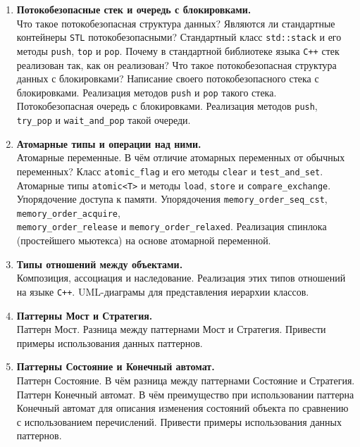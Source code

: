 \documentclass{article}
\begin{document}
\begin{enumerate}
\item \textbf{Потокобезопасные стек и очередь с блокировками.}\\
Что такое потокобезопасная структура данных? Являются ли стандартные контейнеры \texttt{STL} потокобезопасными?
Стандартный класс \texttt{std::stack} и его методы \texttt{push}, \texttt{top} и \texttt{pop}. Почему в стандартной библиотеке языка \texttt{C++} стек реализован так, как он реализован? Что такое потокобезопасная структура данных с блокировками? Написание своего потокобезопасного стека с блокировками. Реализация методов \texttt{push} и \texttt{pop} такого стека. Потокобезопасная очередь с блокировками. Реализация методов \texttt{push}, \texttt{try\_pop} и \texttt{wait\_and\_pop} такой очереди.

\item \textbf{Атомарные типы и операции над ними.}\\
Атомарные переменные. В чём отличие атомарных переменных от обычных переменных? Класс \texttt{atomic\_flag} и его методы \texttt{clear} и \texttt{test\_and\_set}. Атомарные типы \texttt{atomic<T>} и методы \texttt{load}, \texttt{store} и \texttt{compare\_exchange}. Упорядочение доступа к памяти. Упорядочения \texttt{memory\_order\_seq\_cst}, \texttt{memory\_order\_acquire}, \\ \texttt{memory\_order\_release} и \texttt{memory\_order\_relaxed}. Реализация спинлока (простейшего мьютекса) на основе атомарной переменной.



\iffalse
\item \textbf{Типы отношений между объектами.}\\
Композиция, ассоциация и наследование. Реализация этих типов отношений на языке \texttt{C++}. UML-диаграмы для представления иерархии классов.


\item \textbf{Паттерны Мост и Стратегия.}\\
Паттерн Мост. Разница между паттернами Мост и Стратегия. Привести примеры использования данных паттернов.


\item \textbf{Паттерны Состояние и Конечный автомат.}\\
Паттерн Состояние. В чём разница между паттернами Состояние и Стратегия. Паттерн Конечный автомат. В чём преимущество при использовании паттерна Конечный автомат для описания изменения состояний объекта по сравнению с использованием перечислений. Привести примеры использования данных паттернов.


\end{enumerate}
\end{document}
